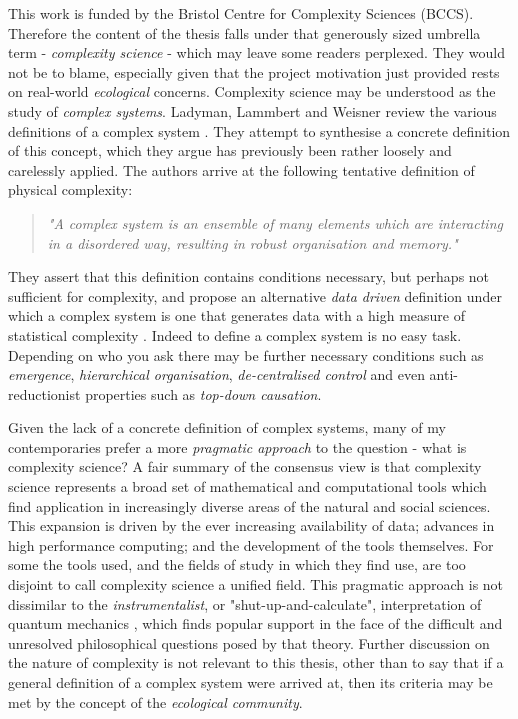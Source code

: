 This work is funded by the Bristol Centre for Complexity Sciences (BCCS). Therefore the content of the thesis falls under that generously sized umbrella term - \emph{complexity science} - which may leave some readers perplexed. They would not be to blame, especially given that the project motivation just provided rests on real-world \emph{ecological} concerns. Complexity science may be understood as the study of \emph{complex systems}. Ladyman, Lammbert and Weisner review the various definitions of a complex system \cite{ladyman2013complex}. They attempt to synthesise a concrete definition of this concept, which they argue has previously been rather loosely and carelessly applied. The authors arrive at the following tentative  definition of physical complexity:
\begin{quotation}
\emph{"A  complex  system  is  an  ensemble  of  many  elements which are interacting in a disordered way, resulting in robust organisation and memory."}
\end{quotation}
They assert that this definition contains conditions necessary, but perhaps not sufficient for complexity, and propose an alternative \emph{data driven} definition under which a complex system is one that generates data with a high measure of statistical complexity \cite{crutchfield1989inferring}. Indeed to define a complex system is no easy task. Depending on who you ask there may be further necessary conditions such as \emph{emergence}, \emph{hierarchical organisation}, \emph{de-centralised control} and even anti-reductionist properties such as \emph{top-down causation}. 

Given the lack of a concrete definition of complex systems, many of my contemporaries prefer a more \emph{pragmatic approach} to the question - what is complexity science? A fair summary of the consensus view is that complexity science represents a broad set of mathematical and computational tools which find application in increasingly diverse areas of the natural and social sciences. This expansion is driven by the ever increasing availability of data; advances in high performance computing; and the development of the tools themselves. For some the tools used, and the fields of study in which they find use, are too disjoint to call complexity science a unified field. This pragmatic approach is not dissimilar to the \emph{instrumentalist}, or "shut-up-and-calculate", interpretation of quantum mechanics \cite{norris2002quantum}, which finds popular support in the face of the difficult and unresolved philosophical questions posed by that theory. Further discussion on the nature of complexity is not relevant to this thesis, other than to say that if a general definition of a complex system were arrived at, then its criteria may be met by the concept of the \emph{ecological community}.

